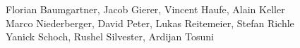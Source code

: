 %
%
%
Florian Baumgartner,	%
Jacob Gierer,		%
Vincent Haufe,		%
Alain Keller		%
\\
Marco Niederberger,	%
David Peter,		%
Lukas Reitemeier,	%
Stefan Richle          %
\\
Yanick Schoch,		%
Rushel Silvester,
Ardijan Tosuni		%
